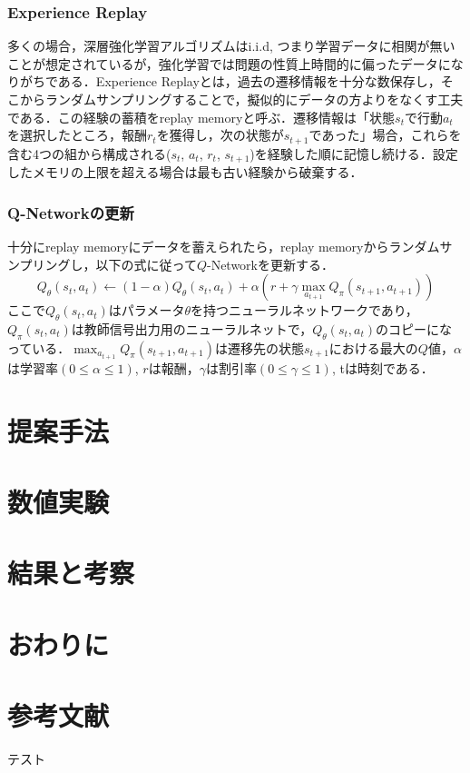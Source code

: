 \documentclass[twocolumn]{jarticle}
\begin{document}
        \subsubsection{Experience Replay}
        多くの場合，深層強化学習アルゴリズムはi.i.d, つまり学習データに相関が無いことが想定されているが，強化学習では問題の性質上時間的に偏ったデータになりがちである．Experience Replayとは，過去の遷移情報を十分な数保存し，そこからランダムサンプリングすることで，擬似的にデータの方よりをなくす工夫である．この経験の蓄積をreplay memoryと呼ぶ．遷移情報は「状態$s_t$で行動$a_t$を選択したところ，報酬$r_t$を獲得し，次の状態が$s_{t+1}$であった」場合，これらを含む4つの組から構成される($s_t$, $a_t$, $r_t$, $s_{t+1}$)を経験した順に記憶し続ける．設定したメモリの上限を超える場合は最も古い経験から破棄する．

        \subsubsection{Q-Networkの更新}
        十分にreplay memoryにデータを蓄えられたら，replay memoryからランダムサンプリングし，以下の式に従って$Q$-Networkを更新する．
        \begin{equation}
            Q_\theta(s_t,a_t)\leftarrow(1-\alpha)Q_\theta(s_t,a_t)+\alpha(r+\gamma\max_{a_{t+1}}Q_\pi(s_{t+1},a_{t+1}))
        \end{equation}
        ここで$Q_\theta(s_t,a_t)$はパラメータ$\theta$を持つニューラルネットワークであり，$Q_\pi(s_t,a_t)$は教師信号出力用のニューラルネットで，$Q_\theta(s_t,a_t)$のコピーになっている．$\max_{a_{t+1}}Q_\pi(s_{t+1},a_{t+1})$は遷移先の状態$s_{t+1}$における最大の$Q$値，$\alpha$は学習率$(0\leq \alpha\leq 1)$, $r$は報酬，$\gamma$は割引率$(0\leq \gamma\leq 1)$, tは時刻である．


\section{提案手法}

\section{数値実験}

\section{結果と考察}

\section{おわりに}

\section{参考文献}
\begin{thebibliography}{99}
     テスト
\end{thebibliography}
\end{document}
